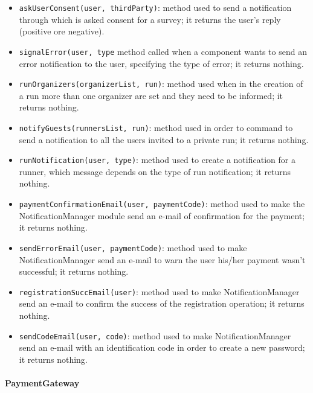 \begin{itemize}
\item[ ]\texttt{askUserConsent(user, thirdParty)}: method used to send a notification through which is asked consent for a survey; it returns the user's reply (positive ore negative).

\item[ ]\texttt{signalError(user, type} method called when a component wants to send an error notification to the user, specifying the type of error; it returns nothing.

\item[ ]\texttt{runOrganizers(organizerList, run)}: method used when in the creation of a run more than one organizer are set and they need to be informed; it returns nothing.

\item[ ]\texttt{notifyGuests(runnersList, run)}: method used in order to command to send a notification to all the users invited to a private run; it returns nothing.

\item[ ]\texttt{runNotification(user, type)}: method used to create a notification for a runner, which message depends on the type of run notification; it returns nothing.

\item[ ]\texttt{paymentConfirmationEmail(user, paymentCode)}: method used to make the NotificationManager module send an e-mail of confirmation for the payment; it returns nothing.

\item[ ]\texttt{sendErrorEmail(user, paymentCode)}: method used to make NotificationManager send an e-mail to warn the user his/her payment wasn't successful; it returns nothing.

\item[ ]\texttt{registrationSuccEmail(user)}: method used to make NotificationManager send an e-mail to confirm the success of the registration operation; it returns nothing.

\item[ ]\texttt{sendCodeEmail(user, code)}: method used to make NotificationManager send an e-mail with an identification code in order to create a new password; it returns nothing.
\end{itemize}

\paragraph*{PaymentGateway}

